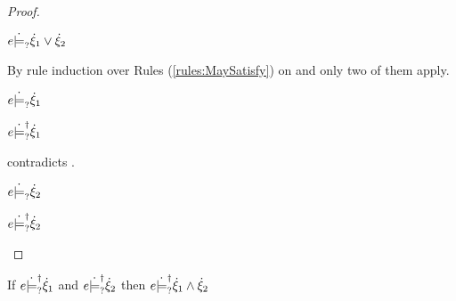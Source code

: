 \begin{proof}
\begin{byCases}
  \item[\text{(\ref{rule:CSMSMay})}]
    \begin{pfsteps*}
    \item $e \dot{\models}_{?} \dot{\xi}_1 \vee \dot{\xi}_2$  
    \end{pfsteps*}
    By rule induction over Rules (\ref{rules:MaySatisfy}) on  and only two of them apply.
    \begin{byCases}

    \item[\text{(\ref{rule:CMSOr1})}]
      \begin{pfsteps*}
      \item $e \dot{\models}_{?} \dot{\xi}_1$  
      \item $e \dot{\models}_{?}^{\dag} \dot{\xi}_1$  
      \end{pfsteps*}
       contradicts .

    \item[\text{(\ref{rule:CMSOr2})}]
      \begin{pfsteps*}
      \item $e \dot{\models}_{?} \dot{\xi}_2$  
      \item $e \dot{\models}_{?}^{\dag} \dot{\xi}_2$ 
      \end{pfsteps*}
    \end{byCases}
    \resetpfcounter
  \end{byCases}
\end{proof}

\begin{lemma}
  \label{lem:satormay-and}
  If $e \dot{\models}_{?}^{\dag} \dot{\xi}_1$ and $e \dot{\models}_{?}^{\dag} \dot{\xi}_2$ then $e \dot{\models}_{?}^{\dag} \dot{\xi}_1 \wedge \dot{\xi}_2$
\end{lemma}


